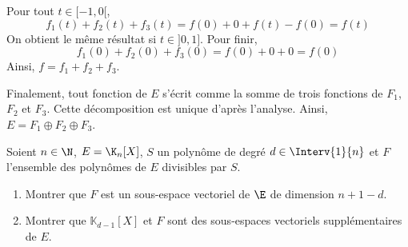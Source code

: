 \documentclass[a4paper,10pt]{report}
\begin{document}
\medskip

\noindent Pour tout $t \in [-1,0[$,
$$ f_1(t)+f_2(t)+f_3(t) = f(0) + 0 + f(t)-f(0) = f(t)$$
On obtient le même résultat si $t \in ]0,1]$. Pour finir,
$$ f_1(0)+f_2(0)+f_3(0) = f(0) + 0 + 0 = f(0)$$
Ainsi, $f=f_1+f_2+f_3$.

\medskip

\noindent Finalement, tout fonction de $E$ s'écrit comme la somme de trois fonctions de $F_1$, $F_2$ et $F_3$. Cette décomposition est unique d'après l'analyse. Ainsi, $E = F_1 \oplus F_2 \oplus F_3$.

\medskip

\begin{Exercice}{} Soient $n\in\N$, $E=\K_n[X]$, $S$ un polynôme de degré $d \in \Interv{1}{n}$ et $F$ l'ensemble des polynômes de $E$ divisibles par $S$.
\begin{enumerate}
	\item Montrer que $F$ est un sous-espace vectoriel de $\E$ de dimension $n+1-d$.
	\item Montrer que $\mathbb{K}_{d-1}[X]$  et $F$ sont des sous-espaces vectoriels supplémentaires de $E$.
\end{enumerate} 
\end{Exercice}
\end{document}
